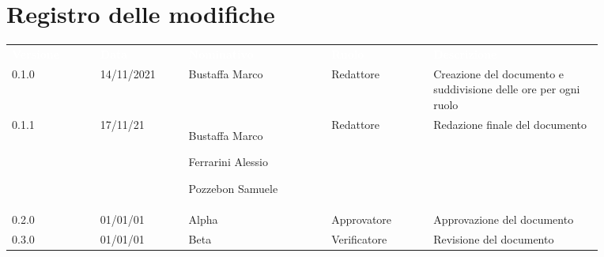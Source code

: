 \section*{Registro delle modifiche}

{\renewcommand{\arraystretch}{1.5}
\begin{tabular}{p{0.13\linewidth}p{0.13\linewidth}p{0.21\linewidth}p{0.15\linewidth}p{0.25\linewidth}}
	\rowcolor[RGB]{33, 73, 50}
	\textcolor{white}{\textbf{Versione}} & \textcolor{white}{\textbf{Data}} & \textcolor{white}
	{\textbf{Nominativo}} & \textcolor{white}{\textbf{Ruolo}} & \textcolor{white}
	{\textbf{Descrizione}}\\
	\rowcolor[RGB]{216, 235, 171}
	0.1.0 & 14/11/2021 & Bustaffa Marco & Redattore & Creazione del documento e suddivisione delle ore per ogni ruolo\\
	\rowcolor[RGB]{233, 245, 206}
	0.1.1 & 17/11/21 & Bustaffa Marco \par  Ferrarini Alessio  \par Pozzebon Samuele & Redattore & Redazione finale del documento\\
	\rowcolor[RGB]{216, 235, 171}
	0.2.0 & 01/01/01 & Alpha & Approvatore & Approvazione del documento\\
	\rowcolor[RGB]{233, 245, 206}
	0.3.0 & 01/01/01 & Beta & Verificatore & Revisione del documento\\
\end{tabular}	
}